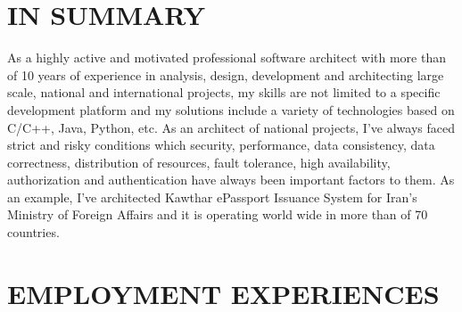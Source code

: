 \documentclass[10pt,a4paper]{article}
\begin{document}
\thispagestyle{fancy}

\vspace*{1px}
\section{IN SUMMARY}
As a highly active and motivated professional software architect with more than of 10 years of experience in analysis, design, development and architecting large scale, national and international projects, my skills are not limited to a specific development platform and my solutions include a variety of technologies based on C/C++, Java, Python, etc. As an architect of national projects, I've always faced strict and risky conditions which security, performance, data consistency, data correctness, distribution of resources, fault tolerance, high availability, authorization and authentication have always been important factors to them. As an example, I've architected Kawthar ePassport Issuance System for Iran's Ministry of Foreign Affairs and it is operating world wide in more than of 70 countries.


\section{EMPLOYMENT EXPERIENCES}
\end{document}
